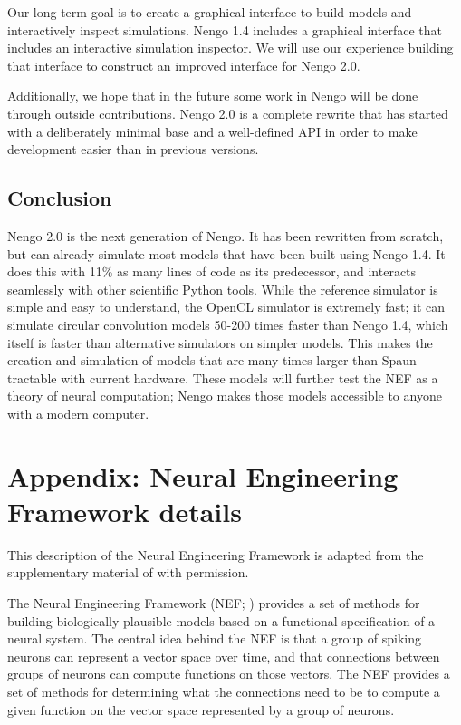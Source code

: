 \documentclass{frontiersSCNS}
\begin{document}
Our long-term goal is to
create a graphical interface
to build models and
interactively inspect simulations.
Nengo 1.4 includes a graphical interface
that includes an interactive simulation inspector.
We will use our experience building that interface
to construct an improved interface
for Nengo 2.0.

Additionally, we hope that in the future
some work in Nengo will be
done through outside contributions.
Nengo 2.0 is a complete rewrite that
has started with a deliberately minimal base
and a well-defined API
in order to make development easier than in
previous versions.

\subsection{Conclusion}

Nengo 2.0 is the next generation of Nengo.
It has been rewritten from scratch,
but can already simulate most models
that have been built using Nengo 1.4.
It does this with 11\% as many lines of code
as its predecessor,
and interacts seamlessly with
other scientific Python tools.
While the reference simulator
is simple and easy to understand,
the OpenCL simulator is extremely fast;
it can simulate circular convolution models
50-200 times faster than Nengo 1.4,
which itself is faster than alternative simulators
on simpler models.
This makes the creation and simulation
of models that are many times larger than Spaun
tractable with current hardware.
These models will further test
the NEF as a theory of neural computation;
Nengo makes those models
accessible to anyone with
a modern computer.

\appendix
\section*{Appendix: Neural Engineering Framework details}

This description of the Neural Engineering Framework
is adapted from the supplementary material
of \citep{eliasmith2012} with permission.

The Neural Engineering Framework (NEF; \citealp{eliasmith2003})
provides a set of methods
for building biologically plausible models
based on a functional specification of a neural system.
The central idea behind the NEF
is that a group of spiking neurons
can represent a vector space over time,
and that connections between
groups of neurons
can compute functions on those vectors.
The NEF provides a set of methods
for determining what the connections
need to be to compute a given function
on the vector space
represented by a group of neurons.
\end{document}
